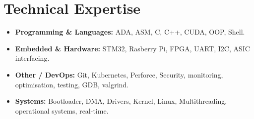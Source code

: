 \documentclass[9pt,a4paper]{article}
\begin{document}
\section*{Technical Expertise}
\begin{tcolorbox}[mybox]
\begin{itemize}
\item \textbf{Programming \& Languages:} ADA, ASM, C, C++, CUDA, OOP, Shell.

\item \textbf{Embedded \& Hardware:} STM32, Rasberry Pi, FPGA, UART, I2C, ASIC interfacing.

\item \textbf{Other / DevOps:} Git, Kubernetes, Perforce, Security, monitoring, optimisation, testing, GDB, valgrind.

\item \textbf{Systems:} Bootloader, DMA, Drivers, Kernel, Linux, Multithreading, operational systems, real-time.
\end{itemize}
\end{tcolorbox}
\end{document}
